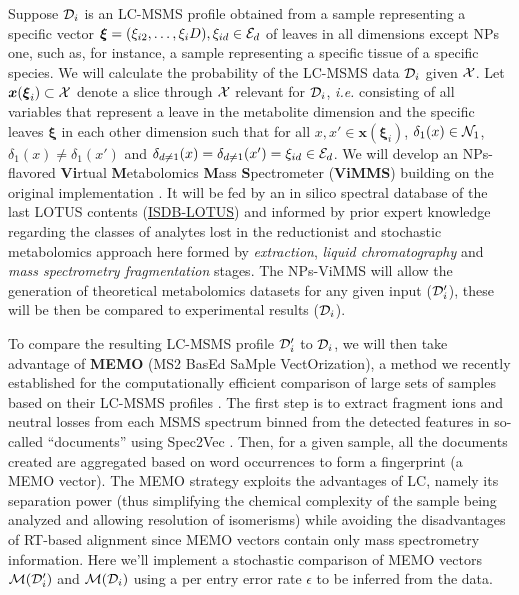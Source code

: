 \documentclass[
11pt, %
oneside, %
english, %
singlespacing, %
headsepline, %
chapterinoneline, %
]{MastersDoctoralThesis} %
\def\E{\mathbb{E}}
\def\x{\boldsymbol{x}}
\def\bxi{\boldsymbol{\xi}}
\def\E{{\cal E}}
\def\N{{\cal N}}
\def\M{{\cal M}}
\def\X{{\cal X}}
\def\D{{\cal D}}
\begin{document}
Suppose $\D_i$ is an LC-MSMS profile obtained from a sample representing a specific vector $\bxi=(\xi_{i2}, \ldots, \xi_i{D}), \xi_{id} \in \E_d$ of leaves in all dimensions except NPs one, such as, for instance, a sample representing a specific tissue of a specific species. We will calculate the probability of the LC-MSMS data $\D_i$ given $\X$. Let $\x(\bxi_i) \subset \X$ denote a slice through $\X$ relevant for $\D_i$, \textit{i.e.} consisting of all variables that represent a leave in the metabolite dimension and the specific leaves $\bxi$ in each other dimension such that for all $x,x' \in \x(\bxi_i)$, $\delta_1(x) \in \N_1$, $\delta_1(x) \neq \delta_1(x')$ and $\delta_{d \neq 1}(x) =\delta_{d \neq 1}(x') = \xi_{id} \in \E_d$. We will develop an NPs-flavored \textbf{Vi}rtual \textbf{M}etabolomics \textbf{M}ass \textbf{S}pectrometer (\textbf{ViMMS}) building on the original implementation \cite{wandySilicoOptimizationMass2019}. It will be fed by an in silico spectral database of the last LOTUS contents (\href{https://doi.org/10.5281/zenodo.8287341}{ISDB-LOTUS}) and informed by prior expert knowledge regarding the classes of analytes lost in the reductionist and stochastic metabolomics approach here formed by \textit{extraction}, \textit{liquid chromatography} and \textit{mass spectrometry fragmentation} stages. The NPs-ViMMS will allow the generation of theoretical metabolomics datasets for any given input ($\D_i'$), these will be then be compared to experimental results ($\D_i$).

To compare the resulting LC-MSMS profile $\D_i'$ to $\D_i$, we will then take advantage of \textbf{MEMO} (MS2 BasEd SaMple VectOrization), a method we recently established for the computationally efficient comparison of large sets of samples based on their LC-MSMS profiles \cite{gaudryMEMOMassSpectrometryBased2022}. The first step is to extract fragment ions and neutral losses from each MSMS spectrum binned from the detected features in so-called “documents” using Spec2Vec \cite{huberSpec2VecImprovedMass2021}. Then, for a given sample, all the documents created are aggregated based on word occurrences to form a fingerprint (a MEMO vector). The MEMO strategy exploits the advantages of LC, namely its separation power (thus simplifying the chemical complexity of the sample being analyzed and allowing resolution of isomerisms) while avoiding the disadvantages of RT-based alignment since MEMO vectors contain only mass spectrometry information. Here we'll implement a stochastic comparison of MEMO vectors $\M(\D_i')$ and $\M(\D_i)$ using a per entry error rate $\epsilon$ to be inferred from the data.
\end{document}
